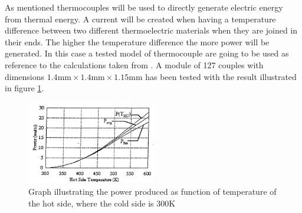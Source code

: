  \label{sec:thermocouples}
As mentioned thermocouples will be used to directly generate electric energy from thermal energy. A current will be created when having a temperature difference between two different thermoelectric materials when they are joined in their ends. The higher the temperature difference the more power will be generated. In this case a tested model of thermocouple are going to be used as reference to the calculations taken from \cite{lau1997a}. A module of 127 couples with dimensions $1.4\text{mm}\times 1.4\text{mm}\times 1.15\text{mm}$ has been tested with the result illustrated in figure \ref{fig:thermocouple}.\\

\begin{figure}[htb]
  \begin{center}
  \includegraphics[width=0.5\textwidth]{figures/Ricardo/thermocouples.png}
  \caption{Graph illustrating the power produced as function of temperature of the hot side, where the cold side is 300K}
  \label{fig:thermocouple}
  \end{center}
\end{figure}

